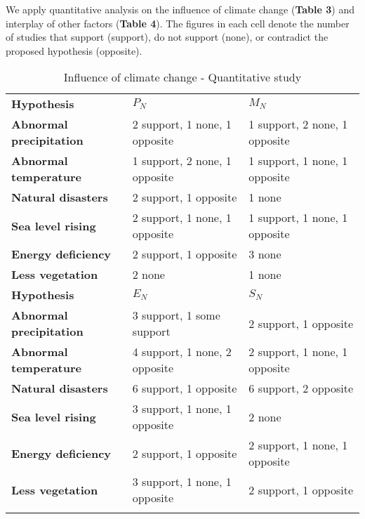 \documentclass{mcmthesis}
\newlength\savedwidth
\newcommand\whline{\noalign{\global\savedwidth\arrayrulewidth
		\global\arrayrulewidth 1.2pt}%
	\hline
	\noalign{\global\arrayrulewidth\savedwidth}}
\newlength\savewidth
\newcommand\shline{\noalign{\global\savewidth\arrayrulewidth
		\global\arrayrulewidth 1.2pt}%
	\hline
	\noalign{\global\arrayrulewidth\savewidth}}
\begin{document}
	We apply quantitative analysis on the influence of climate change (\textbf{Table 3}) and interplay of other factors (\textbf{Table 4}). The figures in each cell denote the number of studies that support (support), do not support (none), or contradict the proposed hypothesis (opposite). 
	\begin{table}[htbp]
		\renewcommand\arraystretch{1.5}
		\footnotesize
		\centering
		\begin{tabular}{m{3.8cm}<{\centering}|m{4.8cm}<{\centering}|m{4.8cm}<{\centering}}
			\whline
			\textbf{Hypothesis}&\textbf{$P_N$}&\textbf{$M_N$}\\
			\whline
			\textbf{Abnormal precipitation}& 2 support, 1 none, 1 opposite &1 support, 2 none, 1 opposite\\
			
			\textbf{Abnormal temperature}&1 support, 2 none, 1 opposite&1 support, 1 none, 1 opposite\\
			
			\textbf{Natural disasters}&2 support, 1 opposite&1 none\\
			
			\textbf{Sea level rising}&2 support, 1 none, 1 opposite&1 support, 1 none, 1 opposite\\
			
			\textbf{Energy deficiency}&2 support, 1 opposite&3 none\\
			
			\textbf{Less vegetation}&2 none&1 none\\
			
			\shline
			\textbf{Hypothesis}&\textbf{$E_N$}&\textbf{$S_N$}\\
			\whline
			\textbf{Abnormal precipitation}& 3 support, 1 some support &2 support, 1 opposite\\
			
			\textbf{Abnormal temperature}&4 support, 1 none, 2 opposite&2 support, 1 none, 1 opposite\\
			
			\textbf{Natural disasters}&6 support, 1 opposite&6 support, 2 opposite\\
			
			\textbf{Sea level rising}&3 support, 1 none, 1 opposite&2 none\\
			
			\textbf{Energy deficiency}&2 support, 1 opposite&2 support, 1 none, 1 opposite\\
			
			\textbf{Less vegetation}&3 support, 1 none, 1 opposite&2 support, 1 opposite\\
			\shline
		\end{tabular}
		\caption{Influence of climate change - Quantitative study}\label{tab:Influence of climate change - Quantitative study}
	\end{table}
	
\end{document}
